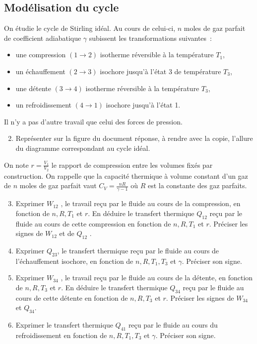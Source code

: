 \documentclass[a4paper, 12pt, garamond]{book}
\begin{document}
\subsection{Modélisation du cycle}

On étudie le cycle de Stirling idéal. Au cours de celui-ci, \(n\) moles
de gaz parfait de coefficient adiabatique \(\gamma\) subissent les
transformations suivantes~:

\begin{itemize}
	\item
	      une compression \((1 \to 2)\) isotherme réversible à la température
	      \(T_1\),
	\item
	      un échauffement \((2 \to 3)\) isochore jusqu'à l'état 3 de température
	      \(T_3\),
	\item
	      une détente \((3 \to 4)\) isotherme réversible à la température
	      \(T_3\),
	\item
	      un refroidissement \((4 \to 1)\) isochore jusqu'à l'état 1.
\end{itemize}

Il n'y a pas d'autre travail que celui des forces de pression.

\begin{enumerate}
	\setcounter{enumi}{1}
	\item
	      Représenter sur la figure du document réponse, à rendre avec la copie,
	      l'allure du diagramme correspondant au cycle idéal.
\end{enumerate}

On note \(r = \frac{V_1}{V_2}\) le rapport de compression entre les
volumes fixés par construction. On rappelle que la capacité thermique à
volume constant d'un gaz de \(n\) moles de gaz parfait vaut
\(C_V=\frac{nR}{\gamma -1}\) où \(R\) est la constante des gaz parfaits.

\begin{enumerate}
	\setcounter{enumi}{2}
	\item
	      Exprimer \(W_{12}\) , le travail reçu par le fluide au cours de la
	      compression, en fonction de \(n, R, T_1\) et \(r\). En déduire le
	      transfert thermique \(Q_{12}\) reçu par le fluide au cours de cette
	      compression en fonction de \(n, R, T_1\) et \(r\). Préciser les signes
	      de \(W_{12}\) et de \(Q_{12}\) .
	\item
	      Exprimer \(Q_{23}\), le transfert thermique reçu par le fluide au
	      cours de l'échauffement isochore, en fonction de \(n, R, T_1, T_3\) et
	      \(\gamma\). Préciser son signe.
	\item
	      Exprimer \(W_{34}\) , le travail reçu par le fluide au cours de la
	      détente, en fonction de \(n, R, T_3\) et \(r\). En déduire le
	      transfert thermique \(Q_{34}\) reçu par le fluide au cours de cette
	      détente en fonction de \(n, R, T_3\) et \(r\). Préciser les signes de
	      \(W_{34}\) et \(Q_{34}\).
	\item
	      Exprimer le transfert thermique \(Q_{41}\) reçu par le fluide au cours
	      du refroidissement en fonction de \(n, R, T_1 , T_3\) et \(\gamma\).
	      Préciser son signe.
\end{enumerate}
\end{document}

